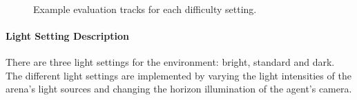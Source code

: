 \begin{figure}
    \centering
    \qquad
    \qquad
    \\
    \caption{Example evaluation tracks for each difficulty setting.}
    \label{fig:track_difficulty_settings}
\end{figure}

\paragraph{Light Setting Description}
There are three light settings for the environment: bright, standard and dark. The different light settings are implemented by varying the light intensities of the arena's light sources and changing the horizon illumination of the agent's camera.

